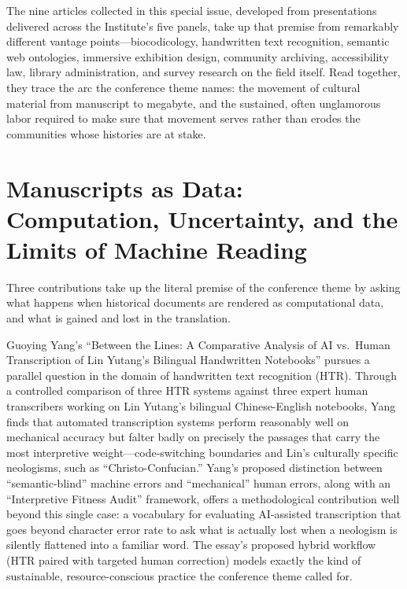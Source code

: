 \documentclass[final]{anthology-ch}  %
\begin{document}
The nine articles collected in this special issue, developed from presentations delivered across the Institute's five panels, take up that premise from remarkably different vantage points---biocodicology, handwritten text recognition, semantic web ontologies, immersive exhibition design, community archiving, accessibility law, library administration, and survey research on the field itself. Read together, they trace the arc the conference theme names: the movement of cultural material from manuscript to megabyte, and the sustained, often unglamorous labor required to make sure that movement serves rather than erodes the communities whose histories are at stake.

\section{Manuscripts as Data: Computation, Uncertainty, and the Limits of Machine Reading}

Three contributions take up the literal premise of the conference theme by asking what happens when historical documents are rendered as computational data, and what is gained and lost in the translation.

Guoying Yang's \enquote{Between the Lines: A Comparative Analysis of AI vs.\ Human Transcription of Lin Yutang's Bilingual Handwritten Notebooks} pursues a parallel question in the domain of handwritten text recognition (HTR). Through a controlled comparison of three HTR systems against three expert human transcribers working on Lin Yutang's bilingual Chinese-English notebooks, Yang finds that automated transcription systems perform reasonably well on mechanical accuracy but falter badly on precisely the passages that carry the most interpretive weight---code-switching boundaries and Lin's culturally specific neologisms, such as \enquote{Christo-Confucian.} Yang's proposed distinction between \enquote{semantic-blind} machine errors and \enquote{mechanical} human errors, along with an \enquote{Interpretive Fitness Audit} framework, offers a methodological contribution well beyond this single case: a vocabulary for evaluating AI-assisted transcription that goes beyond character error rate to ask what is actually lost when a neologism is silently flattened into a familiar word. The essay's proposed hybrid workflow (HTR paired with targeted human correction) models exactly the kind of sustainable, resource-conscious practice the conference theme called for.
\end{document}
